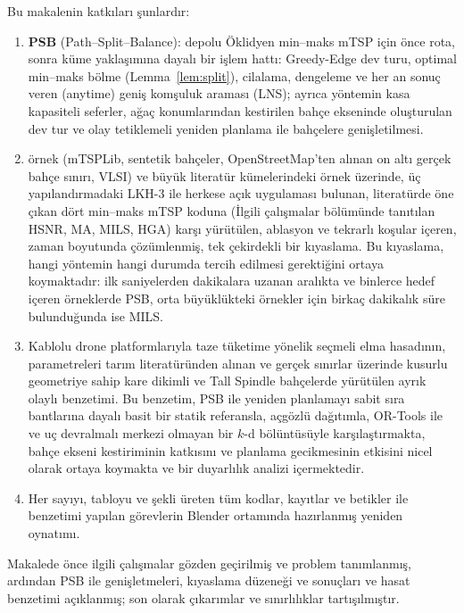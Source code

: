 Bu makalenin katkıları şunlardır:
\begin{enumerate}
\item \textbf{PSB} (Path--Split--Balance): depolu Öklidyen min--maks mTSP için
önce rota, sonra küme yaklaşımına dayalı bir işlem hattı: Greedy-Edge dev turu, optimal
min--maks bölme (Lemma~\ref{lem:split}), cilalama, dengeleme ve her an sonuç veren
(anytime) geniş komşuluk araması (LNS); ayrıca yöntemin kasa kapasiteli seferler, ağaç konumlarından
kestirilen bahçe ekseninde oluşturulan dev tur ve olay tetiklemeli yeniden planlama ile
bahçelere genişletilmesi.
\item \InstAll{} örnek (mTSPLib, sentetik bahçeler, OpenStreetMap'ten alınan on altı gerçek
bahçe sınırı, VLSI) ve büyük literatür kümelerindeki \LitCount{} örnek üzerinde, üç
yapılandırmadaki LKH-3 ile herkese açık uygulaması bulunan, literatürde öne çıkan dört
min--maks mTSP koduna (İlgili çalışmalar bölümünde tanıtılan HSNR, MA, MILS, HGA) karşı yürütülen, ablasyon ve tekrarlı koşular içeren,
zaman boyutunda çözümlenmiş, tek çekirdekli bir kıyaslama. Bu kıyaslama, hangi yöntemin hangi durumda
tercih edilmesi gerektiğini ortaya koymaktadır: ilk saniyelerden dakikalara uzanan aralıkta ve
binlerce hedef içeren örneklerde PSB, orta büyüklükteki örnekler için birkaç dakikalık süre
bulunduğunda ise MILS.
\item Kablolu drone platformlarıyla taze tüketime yönelik seçmeli elma hasadının, parametreleri
tarım literatüründen alınan ve gerçek sınırlar üzerinde kusurlu geometriye sahip
kare dikimli ve Tall Spindle bahçelerde yürütülen ayrık olaylı benzetimi.
Bu benzetim, PSB ile yeniden planlamayı sabit sıra bantlarına dayalı basit bir statik referansla,
açgözlü dağıtımla, OR-Tools ile ve uç devralmalı merkezi olmayan bir $k$-d bölüntüsüyle karşılaştırmakta,
bahçe ekseni kestiriminin katkısını ve planlama gecikmesinin etkisini
nicel olarak ortaya koymakta ve bir duyarlılık analizi içermektedir.
\item Her sayıyı, tabloyu ve şekli üreten tüm kodlar, kayıtlar ve betikler ile
benzetimi yapılan görevlerin Blender ortamında hazırlanmış yeniden oynatımı.
\end{enumerate}

Makalede önce ilgili çalışmalar gözden geçirilmiş ve problem tanımlanmış, ardından PSB ile
genişletmeleri, kıyaslama düzeneği ve sonuçları ve hasat benzetimi açıklanmış;
son olarak çıkarımlar ve sınırlılıklar tartışılmıştır.
